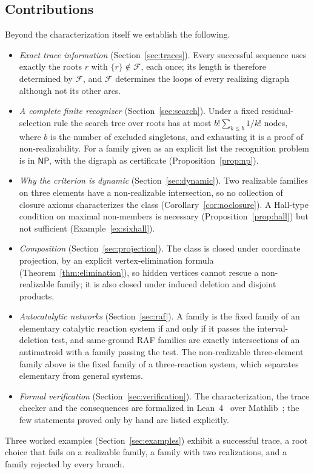 \documentclass[11pt,a4paper]{article}
\theoremstyle{plain}
\theoremstyle{definition}
\theoremstyle{remark}
\newcommand{\cF}{\mathcal F}
\newcommand{\NP}{\mathsf{NP}}
\begin{document}
\subsection{Contributions}

Beyond the characterization itself we establish the following.
\begin{itemize}
\item \emph{Exact trace information} (Section~\ref{sec:traces}). Every successful sequence uses exactly the roots $r$ with $\{r\}\notin\cF$, each once; its length is therefore determined by $\cF$, and $\cF$ determines the loops of every realizing digraph although not its other arcs.
\item \emph{A complete finite recognizer} (Section~\ref{sec:search}). Under a fixed residual-selection rule the search tree over roots has at most $b!\sum_{k\le b}1/k!$ nodes, where $b$ is the number of excluded singletons, and exhausting it is a proof of non-realizability. For a family given as an explicit list the recognition problem is in $\NP$, with the digraph as certificate (Proposition~\ref{prop:np}).
\item \emph{Why the criterion is dynamic} (Section~\ref{sec:dynamic}). Two realizable families on three elements have a non-realizable intersection, so no collection of closure axioms characterizes the class (Corollary~\ref{cor:noclosure}). A Hall-type condition on maximal non-members is necessary (Proposition~\ref{prop:hall}) but not sufficient (Example~\ref{ex:sixhall}).
\item \emph{Composition} (Section~\ref{sec:projection}). The class is closed under coordinate projection, by an explicit vertex-elimination formula (Theorem~\ref{thm:elimination}), so hidden vertices cannot rescue a non-realizable family; it is also closed under induced deletion and disjoint products.
\item \emph{Autocatalytic networks} (Section~\ref{sec:raf}). A family is the fixed family of an elementary catalytic reaction system if and only if it passes the interval-deletion test, and same-ground RAF families are exactly intersections of an antimatroid with a family passing the test. The non-realizable three-element family above is the fixed family of a three-reaction system, which separates elementary from general systems.
\item \emph{Formal verification} (Section~\ref{sec:verification}). The characterization, the trace checker and the consequences are formalized in Lean~4~\cite{demoura2021lean4} over Mathlib~\cite{mathlib2020}; the few statements proved only by hand are listed explicitly.
\end{itemize}
Three worked examples (Section~\ref{sec:examples}) exhibit a successful trace, a root choice that fails on a realizable family, a family with two realizations, and a family rejected by every branch.
\end{document}
